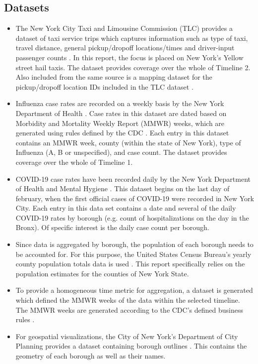 \documentclass[11pt]{article}
\begin{document}
\subsection{Datasets}
\begin{itemize}
    \item The New York City Taxi and Limousine Commission (TLC) provides a dataset of taxi service trips which captures information such as type of taxi, travel distance, general pickup/dropoff locations/times and driver-input passenger counts \cite{tlcdataset}. 
In this report, the focus is placed on New York's Yellow street hail taxis. The dataset provides coverage over the whole of Timeline 2.
Also included from the same source is a mapping dataset for the pickup/dropoff location IDs included in the TLC dataset \cite{tlcdataset}.
    \item Influenza case rates are recorded on a weekly basis by the New York Department of Health \cite{fludataset}. 
Case rates in this dataset are dated based on Morbidity and Mortality Weekly Report (MMWR) weeks, which are generated using rules defined by the CDC \cite{mmwr}.
Each entry in this dataset contains an MMWR week, county (within the state of New York), type of Influenza (A, B or unspecified), and case count.
The dataset provides coverage over the whole of Timeline 1.
    \item COVID-19 case rates have been recorded daily by the New York Department of Health and Mental Hygiene \cite{coviddataset}.
This dataset begins on the last day of february, when the first official cases of COVID-19 were recorded in New York City. 
Each entry in this data set contains a date and several of the daily COVID-19 rates by borough (e.g. count of hospitalizations on the day in the Bronx).
Of specific interest is the daily case count per borough.
    \item Since data is aggregated by borough, the population of each borough needs to be accounted for.
    For this purpose, the United States Census Bureau's yearly county population totals data is used \cite{populations2019, populations2020}.
    This report specifically relies on the population estimates for the counties of New York State.
    \item To provide a homogeneous time metric for aggregation, a dataset is generated which defined the MMWR weeks of the data within the selected timeline.
    The MMWR weeks are generated according to the CDC's defined business rules \cite{mmwr}.
    \item For geospatial visualizations, 
    the City of New York's Department of City Planning provides a dataset containing borough outlines \cite{boroughdataset}.
    This contains the geometry of each borough as well as their names.
\end{itemize}
\end{document}
